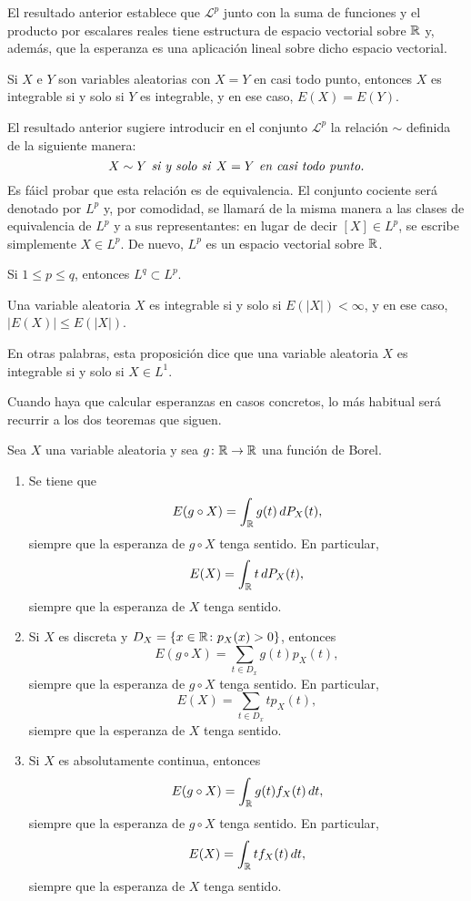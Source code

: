 \documentclass[a4paper, 11pt, extrafontsizes]{memoir}
\begin{document}
El resultado anterior establece que $\mathcal{L}^p$ junto con la suma de funciones y el producto por escalares reales tiene estructura de espacio vectorial sobre $\mathbb R$ y, además, que la esperanza es una aplicación lineal sobre dicho espacio vectorial.

\begin{proposition}
    Si $X$ e $Y$ son variables aleatorias con $X = Y$ en casi todo punto, entonces $X$ es integrable si y solo si $Y$ es integrable, y en ese caso, $E(X) = E(Y)$.
\end{proposition}

El resultado anterior sugiere introducir en el conjunto $\mathcal{L}^p$ la relación $\sim$ definida de la siguiente manera:
\[X \sim Y \textup{\emph{ si y solo si }} X=Y \textup{\emph{ en casi todo punto.}}\]
Es fáicl probar que esta relación es de equivalencia. El conjunto cociente será denotado por $L^p$ y,
por comodidad, se llamará de la misma manera a las clases de equivalencia de $L^p$ y a sus representantes: en lugar de decir $[X] \in L^p$, se escribe simplemente $X \in L^p$. De nuevo, $L^p$ es un espacio vectorial sobre $\mathbb R$.

\begin{proposition}\label{pro:1.6.5}
    Si $1 \leq p \leq q$, entonces $L^q \subset L^p$.
\end{proposition}

\begin{proposition}
    Una variable aleatoria $X$ es integrable si y solo si $E(|X|) <\infty$, y en ese caso, $|E(X)| \leq E(|X|)$.
\end{proposition}

En otras palabras, esta proposición dice que una variable aleatoria $X$ es integrable si y solo si $X \in L^1$.

Cuando haya que calcular esperanzas en casos concretos, lo más habitual será recurrir a los dos teoremas que siguen.

\begin{theorem}\label{teo:1.6.7}
    Sea $X$ una variable aleatoria y sea $g \colon \mathbb R \to \mathbb R$ una función de Borel.
    \begin{enumerate}
        \item Se tiene que
        \[E(g \circ X) = \int_\mathbb R g(t) \, dP_X(t),\]
        siempre que la esperanza de $g \circ X$ tenga sentido. En particular,
        \[E(X)= \int_\mathbb R t \, dP_X(t),\]
        siempre que la esperanza de $X$ tenga sentido.
        \item Si $X$ es discreta y $D_X = \{x \in \mathbb R \colon p_X(x)>0\}$, entonces
        \[E(g \circ X) = \sum_{t \in D_x}g(t)p_X(t),\]
        siempre que la esperanza de $g \circ X$ tenga sentido. En particular,
        \[E(X) = \sum_{t \in D_x}tp_X(t),\]
        siempre que la esperanza de $X$ tenga sentido.
        \item Si $X$ es absolutamente continua, entonces
        \[E(g \circ X) = \int_\mathbb R g(t)f_X(t) \, dt,\]
        siempre que la esperanza de $g \circ X$ tenga sentido. En particular,
        \[E(X) = \int_\mathbb R tf_X(t) \, dt,\]
        siempre que la esperanza de $X$ tenga sentido.
    \end{enumerate}
\end{theorem}
\end{document}
